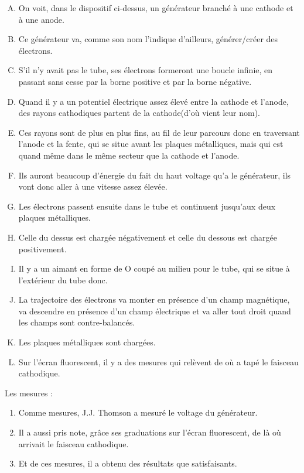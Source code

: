 \documentclass[../main.tex]{subfiles}
\begin{document}
\begin{enumerate}[I]
{    \begin{enumerate}[A. ]
        \item On voit, dans le dispositif ci-dessus, un générateur branché à une cathode et à une anode.
        \item Ce générateur va, comme son nom l'indique d'ailleurs, générer/créer des électrons.
        \item S'il n'y avait pas le tube, ses électrons formeront une boucle infinie, en passant sans cesse par la borne positive et par la borne négative. 
         \item Quand il y a un potentiel électrique assez élevé entre la cathode et l'anode, des rayons cathodiques partent de la cathode(d'où vient leur nom).
        \item Ces rayons sont de plus en plus fins, au fil de leur parcours donc en traversant l'anode et la fente, qui se situe avant les plaques métalliques, mais qui est quand même dans le même secteur que la cathode et l'anode.
        \item Ils auront beaucoup d'énergie du fait du haut voltage qu'a le générateur, ils vont donc aller à une vitesse assez élevée.
        \item Les électrons passent ensuite dans le tube et continuent jusqu'aux deux plaques métalliques.
        \item Celle du dessus est chargée négativement et celle du dessous est chargée positivement.
        \item Il y a un aimant en forme de O coupé au milieu pour le tube, qui se situe à l'extérieur du tube donc.
        \item La trajectoire des électrons va monter en présence d'un champ magnétique, va descendre en présence d'un champ électrique et  va aller tout droit quand les champs sont contre-balancés. 
        \item Les plaques métalliques sont chargées.
        \item Sur l'écran fluorescent, il y a des mesures qui relèvent de où a tapé le faisceau cathodique. 
    \end{enumerate}
    \item Les mesures :
    \begin{enumerate}
        \item Comme mesures, J.J. Thomson a mesuré le voltage du générateur.
        \item Il a aussi pris note, grâce ses graduations sur l'écran fluorescent, de là où arrivait le faisceau cathodique.
        \item Et de ces mesures, il a obtenu des résultats que satisfaisants.

\end{enumerate}}
\end{enumerate}
\end{document}
